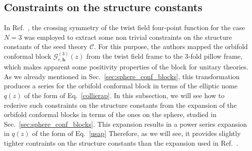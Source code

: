 \documentclass[a4paper,11pt]{article}
\begin{document}
\subsection{Constraints on the structure constants}
\label{sec:bound_str_cts}

In Ref.~\cite{Collier}, the crossing symmetry of the twist field four-point 
function for the case $N=3$ was employed to extract some non trivial constraints on the 
structure constants of the seed theory $\mathcal{C}$. For this purpose, the authors mapped 
the orbifold conformal block $\mathcal{G}_{c, \boldsymbol{h}}^{(3)}(z)$ from the 
twist field frame to the 3-fold pillow frame, which makes apparent some positivity properties of 
the block for unitary theories. As we already mentioned in Sec.~\ref{sec:sphere_conf_blocks}, this transformation
produces a series for the orbifold conformal block in terms of the elliptic nome $q(z)$
of the form of Eq.~\eqref{collierap}. In this subsection, we will see how to rederive 
such constraints on the structure constants from the expansion of the orbifold 
conformal blocks in terms of the ones on the sphere, studied in Sec.~\ref{sec:sphere_conf_blocks}. This 
expansion results in a power series expansion in $q(z)$ of the form of Eq.~\eqref{usap}
Therefore, as we will see, it provides slightly tighter contraints on the structure
constants than the expansion used in Ref.~\cite{Collier}.
\end{document}
